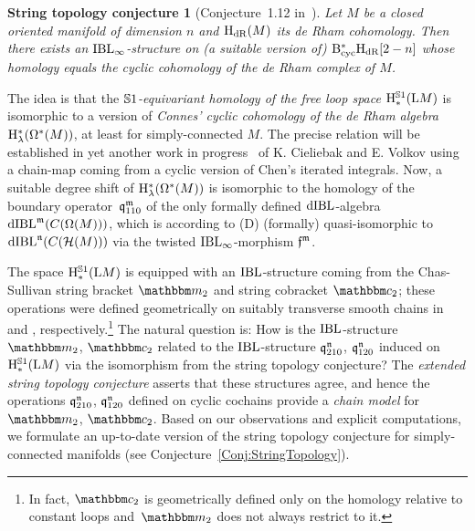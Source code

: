 \documentclass[\MainFolder/Text.tex]{subfiles}
\begin{document}
\newtheorem*{Conject}{String topology conjecture}
\begin{Conject}[Conjecture~1.12 in~\cite{Cieliebak2015}]
Let $M$ be a closed oriented manifold of dimension $n$ and $\mathrm{H}_{\mathrm{dR}}(M)$ its de Rham cohomology. Then there exists an $\mathrm{IBL}_\infty$-structure on (a suitable version of) $\mathrm{B}_{\mathrm{cyc}}^* \mathrm{H}_{\mathrm{dR}}[2-n]$ whose homology equals the cyclic cohomology of the de Rham complex of $M$.
\end{Conject}

The idea is that the \emph{$\mathbb{S}{1}$-equivariant homology of the free loop space} $\mathrm{H}^{\mathbb{S}{1}}_*(\mathrm{L} M)$ is isomorphic to a version of \emph{Connes' cyclic cohomology of the de Rham algebra} $\mathrm{H}_{\lambda}^*(\Omega^*(M))$, at least for simply-connected $M$. The precise relation will be established in yet another work in progress~\cite{Cieliebak2018} of K. Cieliebak and E. Volkov using a chain-map coming from a cyclic version of Chen's iterated integrals. Now, a suitable degree shift of $\mathrm{H}_{\lambda}^*(\Omega^*(M))$ is isomorphic to the homology of the boundary operator~$\mathfrak{q}_{110}^{\mathfrak{m}}$ of the only formally defined $\mathrm{dIBL}$-algebra $\mathrm{dIBL}^{\mathfrak{m}}(C(\Omega(M)))$, which is according to (D) (formally) quasi-isomorphic to $\mathrm{dIBL}^{\mathfrak{n}}(C(\mathcal{H}(M)))$ via the twisted $\mathrm{IBL}_\infty$-morphism $\mathfrak{f}^{\mathfrak{m}}$. 




The space $\mathrm{H}^{\mathbb{S}{1}}_*(\mathrm{L} M)$ is equipped with an $\mathrm{IBL}$-structure coming from the Chas-Sullivan string bracket $\StringOp_2$ and string cobracket $\StringCoOp_2$;  these operations were defined geometrically on suitably transverse smooth chains in \cite{Sullivan1999} and \cite{Sullivan2002}, respectively.\footnote{In fact, $\StringCoOp_2$ is geometrically defined only on the homology relative to constant loops and~$\StringOp_2$ does not always restrict to it.} The natural question is: How is the $\mathrm{IBL}$-structure $\StringOp_2$, $\StringCoOp_2$ related to the $\mathrm{IBL}$-structure $\mathfrak{q}_{210}^{\mathfrak{n}}$, $\mathfrak{q}_{120}^{\mathfrak{n}}$ induced on $\mathrm{H}^{\mathbb{S}{1}}_*(\mathrm{L} M)$ via the isomorphism from the string topology conjecture? The \emph{extended string topology conjecture} asserts that these structures agree, and hence the operations $\mathfrak{q}_{210}^{\mathfrak{n}}$, $\mathfrak{q}_{120}^{\mathfrak{n}}$ defined on cyclic cochains provide a \emph{chain model} for~$\StringOp_2$, $\StringCoOp_2$. Based on our observations and explicit computations, we formulate an up-to-date version of the string topology conjecture for simply-connected manifolds (see Conjecture~\ref{Conj:StringTopology}).
\end{document}

